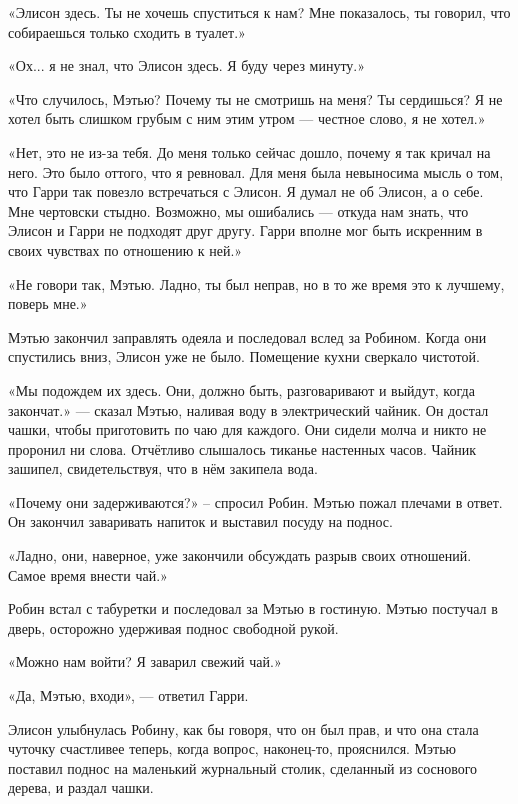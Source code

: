 \documentclass[a4paper,12pt]{book}
\begin{document}
\par
«Элисон здесь. Ты не хочешь спуститься к нам? Мне показалось, ты говорил, что собираешься только сходить в туалет.»
\par
«Ох... я не знал, что Элисон здесь. Я буду через минуту.»
\par
«Что случилось, Мэтью? Почему ты не смотришь на меня? Ты сердишься? Я не хотел быть слишком грубым с ним этим утром — честное слово, я не хотел.»
\par
«Нет, это не из-за тебя. До меня только сейчас дошло, почему я так кричал на него. Это было оттого, что я ревновал. Для меня была невыносима мысль о том, что Гарри так повезло встречаться с Элисон. Я думал не об Элисон, а о себе. Мне чертовски стыдно. Возможно, мы ошибались — откуда нам знать, что Элисон и Гарри не подходят друг другу. Гарри вполне мог быть искренним в своих чувствах по отношению к ней.»
\par
«Не говори так, Мэтью. Ладно, ты был неправ, но в то же время это к лучшему, поверь мне.»\\
\par
Мэтью закончил заправлять одеяла и последовал вслед за Робином. Когда они спустились вниз, Элисон уже не было. Помещение кухни сверкало чистотой.
\par
«Мы подождем их здесь. Они, должно быть, разговаривают и выйдут, когда закончат.» — сказал Мэтью, наливая воду в электрический чайник. Он достал чашки, чтобы приготовить по чаю для каждого. Они сидели молча и никто не проронил ни слова. Отчётливо слышалось тиканье настенных часов. Чайник зашипел, свидетельствуя, что в нём закипела вода.
\par
«Почему они задерживаются?» – спросил Робин. Мэтью пожал плечами в ответ. Он закончил заваривать напиток и выставил посуду на поднос.
\par
«Ладно, они, наверное, уже закончили обсуждать разрыв своих отношений. Самое время внести чай.»
\par
Робин встал с табуретки и последовал за Мэтью в гостиную. Мэтью постучал в дверь, осторожно удерживая поднос свободной рукой.
\par
«Можно нам войти? Я заварил свежий чай.»
\par
«Да, Мэтью, входи», — ответил Гарри.
\par
Элисон улыбнулась Робину, как бы говоря, что он был прав, и что она стала чуточку счастливее теперь, когда вопрос, наконец-то, прояснился. Мэтью поставил поднос на маленький журнальный столик, сделанный из соснового дерева, и раздал чашки.
\end{document}
